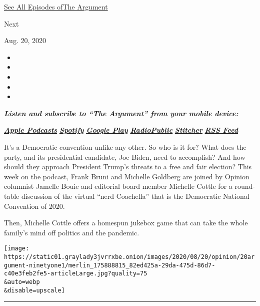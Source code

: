 \href{https://www.nytimes3xbfgragh.onion/column/the-argument}{See All
Episodes ofThe Argument}

Next

Aug. 20, 2020

\begin{itemize}
\item
\item
\item
\item
\item
\end{itemize}

\emph{\textbf{Listen and subscribe to ``The Argument'' from your mobile
device:}}

\textbf{\href{https://itunes.apple.com/us/podcast/the-argument/id1438024613?mt=2}{\emph{Apple
Podcasts}}} \emph{\textbf{\textbar{}}}
\textbf{\href{https://open.spotify.com/show/6bmhSFLKtApYClEuSH8q42}{\emph{Spotify}}}
\emph{\textbf{\textbar{}}}
\textbf{\href{https://play.google.com/music/m/Idxib4hsg3yviao4gtym76knjjy?t=The_Argument}{\emph{Google
Play}}} \emph{\textbf{\textbar{}}}
\textbf{\href{https://radiopublic.com/the-argument-Wdbepr}{\emph{RadioPublic}}}
\emph{\textbf{\textbar{}}}
\textbf{\href{https://www.stitcher.com/podcast/the-new-york-times/the-argument}{\emph{Stitcher}}}
\emph{\textbf{\textbar{}}}
\textbf{\href{https://rss.art19.com/the-argument}{\emph{RSS Feed}}}

It's a Democratic convention unlike any other. So who is it for? What
does the party, and its presidential candidate, Joe Biden, need to
accomplish? And how should they approach President Trump's threats to a
free and fair election? This week on the podcast, Frank Bruni and
Michelle Goldberg are joined by Opinion columnist Jamelle Bouie and
editorial board member Michelle Cottle for a round-table discussion of
the virtual ``nerd Coachella'' that is the Democratic National
Convention of 2020.

Then, Michelle Cottle offers a homespun jukebox game that can take the
whole family's mind off politics and the pandemic.

\texttt{[image: https://static01.graylady3jvrrxbe.onion/images/2020/08/20/opinion/20argument-ninetyone1/merlin\_175888815\_82ed425a-29da-475d-86d7-c40e3feb2fe5-articleLarge.jpg?quality=75\\\&auto=webp\\\&disable=upscale]}

\begin{center}\rule{0.5\linewidth}{\linethickness}\end{center}

